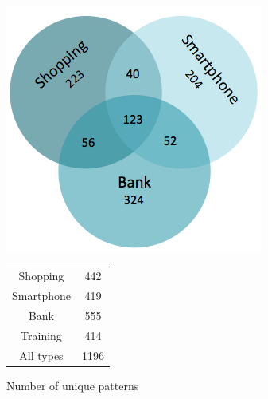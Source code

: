     \begin{figure}[H]
      \centering
      \begin{minipage}[b]{0.40\linewidth}
      \centering
        \includegraphics[scale=0.4]{pics/analysis/uniquePatternsVenn.png}
      \end{minipage}%
      \begin{minipage}[b]{0.30\linewidth}
        \centering
        \begin{tabular}{ c | c }
          \hline
          Shopping &  442 \\
          Smartphone & 419 \\
          Bank & 555 \\
          Training & 414 \\ \hline \hline
          All types & 1196 \\ \hline
        \end{tabular}
        \vspace{1cm}
      \end{minipage}
      \caption{Number of unique patterns}
      \label{fig:test}
    \end{figure}
